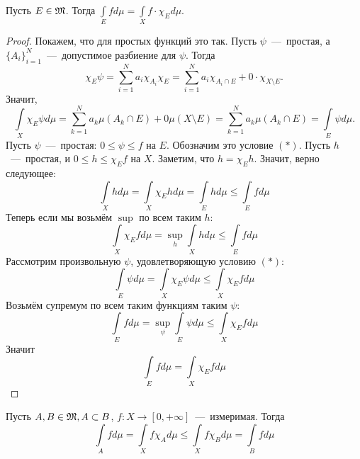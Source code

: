 \begin{proposition}
    Пусть $E \in \mathfrak{M}$. Тогда $\int\limits_E fd\mu = \int\limits_X f \cdot\chi_Ed\mu$.
\end{proposition}
\begin{proof}
    Покажем, что для простых функций это так. Пусть $\psi$~---~простая, а $\{A_i\}_{i = 1}^N$~---~допустимое разбиение для $\psi$. Тогда \[\chi_E\psi = \sum\limits_{i = 1}^N a_i\chi_{A_i}\chi_E = \sum\limits_{i = 1}^N a_i\chi_{A_i \cap E} + 0 \cdot \chi_{X \setminus E}.\] Значит, \[\int\limits_X \chi_E \psi d\mu = \sum\limits_{k = 1}^N a_k \mu(A_k \cap E) + 0\mu(X \setminus E) = \sum\limits_{k = 1}^N a_k\mu(A_k \cap E) = \int\limits_E \psi d \mu.\]
    Пусть $\psi$~---~простая: $0 \leq \psi \leq f$ на $E$. Обозначим это условие $(*)$. Пусть $h$~---~простая, и $0 \leq h \leq \chi_E f$ на $X$.
    Заметим, что $h = \chi_E h$. Значит, верно следующее: \[\int\limits_X hd\mu = \int\limits_X \chi_E h d\mu = \int\limits_E hd\mu \leq \int\limits_E fd\mu\]
    Теперь если мы возьмём $\sup$ по всем таким $h$:
    \[\int\limits_X \chi_E fd\mu = \sup\limits_h \int\limits_X hd\mu \leq \int\limits_E fd\mu\]
    Рассмотрим произвольную $\psi$, удовлетворяющую условию $(*)$:
    \[\int\limits_E \psi d\mu = \int\limits_X \chi_E\psi d\mu \leq \int\limits_X \chi_E fd\mu\]
    Возьмём супремум по всем таким функциям таким $\psi$:
    \[\int\limits_E fd\mu = \sup\limits_\psi \int\limits_E \psi d\mu \leq \int\limits_X \chi_E fd\mu\]
    Значит \[\int\limits_E fd\mu = \int\limits_X \chi_Efd\mu\]
\end{proof}
\begin{corollary}
    Пусть $A, B \in \mathfrak{M}, A \subset B$, $f: X \rightarrow [0, +\infty]$~---~измеримая. Тогда \[\int\limits_A fd\mu = \int\limits_X f\chi_Ad\mu \leq \int\limits_X f\chi_Bd\mu = \int\limits_B fd\mu\]
\end{corollary}

